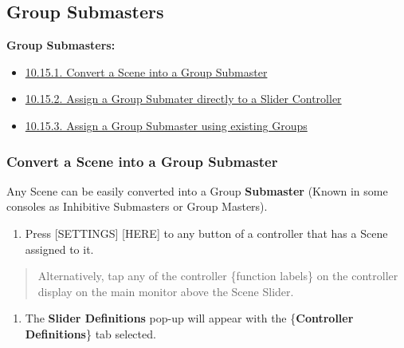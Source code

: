 \documentclass[
]{article}
\providecommand{\tightlist}{%
  \setlength{\itemsep}{0pt}\setlength{\parskip}{0pt}}
\begin{document}
\hypertarget{group-submasters}{%
\subsection{Group Submasters}\label{group-submasters}}

\textbf{Group Submasters:}

\begin{itemize}
\item
  \href{https://vibemanual.compulite.com/programming-cues-and-scenes.html\#convert-a-scene-into-a-group-submaster}{10.15.1. Convert a Scene into a Group Submaster}
\item
  \href{https://vibemanual.compulite.com/programming-cues-and-scenes.html\#assign-a-group-submater-directly-to-a-slider-controller}{10.15.2. Assign a Group Submater directly to a Slider Controller}
\item
  \href{https://vibemanual.compulite.com/programming-cues-and-scenes.html\#assign-a-group-submaster-using-existing-groups}{10.15.3. Assign a Group Submaster using existing Groups}
\end{itemize}

\hypertarget{convert-a-scene-into-a-group-submaster}{%
\subsubsection{Convert a Scene into a Group Submaster}\label{convert-a-scene-into-a-group-submaster}}

Any Scene can be easily converted into a Group \textbf{Submaster} (Known in some consoles as Inhibitive Submasters or Group Masters).

\begin{enumerate}
\def\labelenumi{\arabic{enumi}.}
\tightlist
\item
  Press {[}SETTINGS{]} {[}HERE{]} to any button of a controller that has a Scene assigned to it.
\end{enumerate}

\begin{quote}
Alternatively, tap any of the controller \{function labels\} on the controller display on the main monitor above the Scene Slider.
\end{quote}

\begin{enumerate}
\def\labelenumi{\arabic{enumi}.}
\setcounter{enumi}{1}
\tightlist
\item
  The \textbf{Slider Definitions} pop-up will appear with the \{\textbf{Controller Definitions}\} tab selected.
\end{enumerate}
\end{document}
